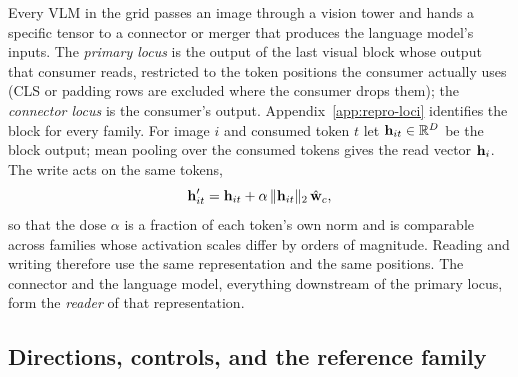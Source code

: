 \documentclass{article}
\begin{document}
Every VLM in the grid passes an image through a vision tower and hands a specific tensor to a connector or merger that produces the language model's inputs. The \emph{primary locus} is the output of the last visual block whose output that consumer reads, restricted to the token positions the consumer actually uses (CLS or padding rows are excluded where the consumer drops them); the \emph{connector locus} is the consumer's output. Appendix~\ref{app:repro-loci} identifies the block for every family. For image $i$ and consumed token $t$ let $\mathbf{h}_{it}\in\mathbb{R}^D$ be the block output; mean pooling over the consumed tokens gives the read vector $\mathbf{h}_i$. The write acts on the same tokens,
\begin{equation}
\mathbf{h}'_{it}=\mathbf{h}_{it}+\alpha\,\lVert\mathbf{h}_{it}\rVert_2\,\hat{\mathbf{w}}_c,
\label{eq:intervention}
\end{equation}
so that the dose $\alpha$ is a fraction of each token's own norm and is comparable across families whose activation scales differ by orders of magnitude. Reading and writing therefore use the same representation and the same positions. The connector and the language model, everything downstream of the primary locus, form the \emph{reader} of that representation.

\subsection{Directions, controls, and the reference family}
\label{sec:directions}
\end{document}
